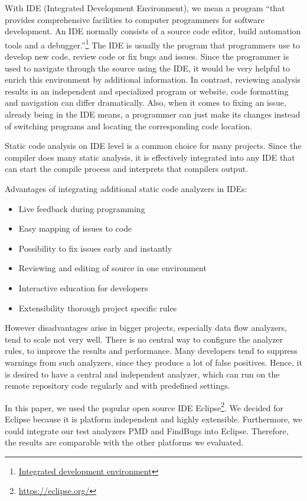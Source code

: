 \documentclass[conference]{IEEEtran}
\begin{document}
With IDE (Integrated Development Environment), we mean a program ``that provides comprehensive facilities to computer programmers for software development. An IDE normally consists of a source code editor, build automation tools and a debugger.''\footnote{\href{http://en.wikipedia.org/wiki/Integrated_development_environment}{Integrated development environment}}
The IDE is usually the program that programmers use to develop new code, review code or fix bugs and issues. Since the programmer is used to navigate through the source using the IDE, it would be very helpful to enrich this environment by additional information. In contrast, reviewing analysis results in an independent and specialized program or website, code formatting and navigation can differ dramatically. Also, when it comes to fixing an issue, already being in the IDE means, a programmer can just make its changes instead of switching programs and locating the corresponding code location.

Static code analysis on IDE level is a common choice for many projects. Since the compiler does many static analysis, it is effectively integrated into any IDE that can start the compile process and interprets that compilers output.

Advantages of integrating additional static code analyzers in IDEs:
\begin{itemize}
	\item Live feedback during programming
	\item Easy mapping of issues to code
	\item Possibility to fix issues early and instantly
	\item Reviewing and editing of source in one environment
	\item Interactive education for developers
	\item Extensibility thorough project specific rules
\end{itemize}

However disadvantages arise in bigger projects, especially data flow analyzers, tend to scale not very well. 
There is no central way to configure the analyzer rules, to improve the results and performance.
Many developers tend to suppress warnings from such analyzers, since they produce a lot of false positives.
Hence, it is desired to have a central and independent analyzer, which can run on the remote repository code regularly and with predefined settings.

In this paper, we used the popular open source IDE Eclipse\footnote{\href{https://eclipse.org/}{https://eclipse.org/}}.
We decided for Eclipse because it is platform independent and highly extensible. Furthermore, we could integrate our test analyzers PMD and FindBugs into Eclipse. Therefore, the results are comparable with the other platforms we evaluated.
\end{document}
